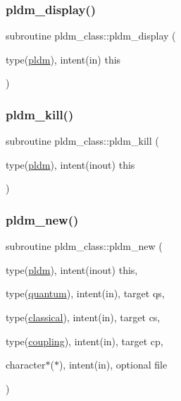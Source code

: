 \mbox{\label{namespacepldm__class_a0b7b20ee63a6203b24c700190738338b}} 
\subsubsection{\texorpdfstring{pldm\+\_\+display()}{pldm\_display()}}
{\footnotesize\ttfamily subroutine pldm\+\_\+class\+::pldm\+\_\+display (\begin{DoxyParamCaption}\item[{type(\hyperlink{structpldm__class_1_1pldm}{pldm}), intent(in)}]{this }\end{DoxyParamCaption})\hspace{0.3cm}{\ttfamily [private]}}

\mbox{\label{namespacepldm__class_ae3cf3688fae95f3ab1729475a8fde0fd}} 
\subsubsection{\texorpdfstring{pldm\+\_\+kill()}{pldm\_kill()}}
{\footnotesize\ttfamily subroutine pldm\+\_\+class\+::pldm\+\_\+kill (\begin{DoxyParamCaption}\item[{type(\hyperlink{structpldm__class_1_1pldm}{pldm}), intent(inout)}]{this }\end{DoxyParamCaption})\hspace{0.3cm}{\ttfamily [private]}}

\mbox{\label{namespacepldm__class_a12da2274f89c7978903a0e5de4c0a2a7}} 
\subsubsection{\texorpdfstring{pldm\+\_\+new()}{pldm\_new()}}
{\footnotesize\ttfamily subroutine pldm\+\_\+class\+::pldm\+\_\+new (\begin{DoxyParamCaption}\item[{type(\hyperlink{structpldm__class_1_1pldm}{pldm}), intent(inout)}]{this,  }\item[{type(\hyperlink{structquantum__class_1_1quantum}{quantum}), intent(in), target}]{qs,  }\item[{type(\hyperlink{structclassical__class_1_1classical}{classical}), intent(in), target}]{cs,  }\item[{type(\hyperlink{structcoupling__class_1_1coupling}{coupling}), intent(in), target}]{cp,  }\item[{character$\ast$($\ast$), intent(in), optional}]{file }\end{DoxyParamCaption})\hspace{0.3cm}{\ttfamily [private]}}

